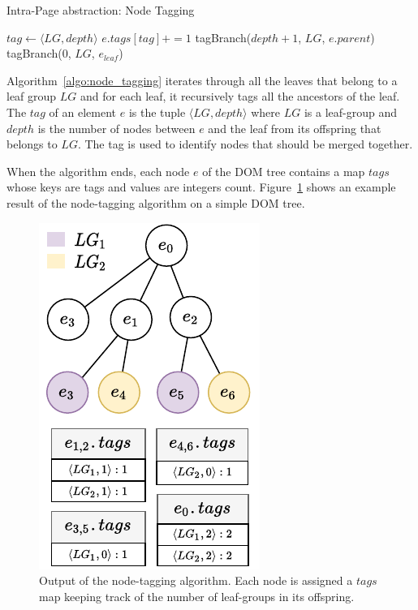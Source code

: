 \begin{algorithm}
\caption{Intra-Page abstraction: Node Tagging}\label{appstract:alg:intra_tagging}
\begin{algorithmic}[1]
      \State $tag \gets \langle LG, depth \rangle$
      \State $e.tags[tag] += 1$ 
      \State tagBranch($depth + 1$, $LG$, $e.parent$)
    \EndFunction
        \State tagBranch(0, $LG$, $e_{leaf}$) 
      \EndFor
    \EndFor
  \EndFunction
\end{algorithmic}
\label{algo:node_tagging}
\end{algorithm}

Algorithm~\ref{algo:node_tagging} iterates through all the leaves that belong to a leaf group $LG$ and for each leaf, it recursively tags all the ancestors of the leaf. 
The $tag$ of an element $e$ is the tuple $\langle LG, depth \rangle$ where $LG$ is a leaf-group and $depth$ is the number of nodes between $e$ and the leaf from its offspring that belongs to $LG$.
The tag is used to identify nodes that should be merged together.

When the algorithm ends, each node $e$ of the DOM tree contains a map $tags$ whose keys are tags and values are integers count. 
Figure~\ref{fig:node_tagging} shows an example result of the node-tagging algorithm on a simple DOM tree. 

\begin{figure}[ht]
  \centering
  \includegraphics[width=0.5\linewidth]{appstract/explanations/node-tagging}
  \caption{Output of the node-tagging algorithm. Each node is assigned a $tags$ map keeping track of the number of leaf-groups in its offspring.}
  \label{fig:node_tagging}
\end{figure}

